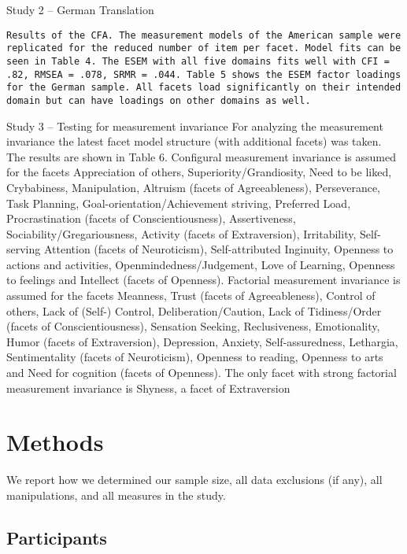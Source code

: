 \documentclass[man]{apa6}
\theoremstyle{definition}
\theoremstyle{definition}
\theoremstyle{definition}
\theoremstyle{remark}
\begin{document}
Study 2 -- German Translation

\begin{verbatim}
Results of the CFA. The measurement models of the American sample were replicated for the reduced number of item per facet. Model fits can be seen in Table 4. The ESEM with all five domains fits well with CFI = .82, RMSEA = .078, SRMR = .044. Table 5 shows the ESEM factor loadings for the German sample. All facets load significantly on their intended domain but can have loadings on other domains as well.
\end{verbatim}

Study 3 -- Testing for measurement invariance For analyzing the
measurement invariance the latest facet model structure (with additional
facets) was taken. The results are shown in Table 6. Configural
measurement invariance is assumed for the facets Appreciation of others,
Superiority/Grandiosity, Need to be liked, Crybabiness, Manipulation,
Altruism (facets of Agreeableness), Perseverance, Task Planning,
Goal-orientation/Achievement striving, Preferred Load, Procrastination
(facets of Conscientiousness), Assertiveness,
Sociability/Gregariousness, Activity (facets of Extraversion),
Irritability, Self-serving Attention (facets of Neuroticism),
Self-attributed Inginuity, Openness to actions and activities,
Openmindedness/Judgement, Love of Learning, Openness to feelings and
Intellect (facets of Openness). Factorial measurement invariance is
assumed for the facets Meanness, Trust (facets of Agreeableness),
Control of others, Lack of (Self-) Control, Deliberation/Caution, Lack
of Tidiness/Order (facets of Conscientiousness), Sensation Seeking,
Reclusiveness, Emotionality, Humor (facets of Extraversion), Depression,
Anxiety, Self-assuredness, Lethargia, Sentimentality (facets of
Neuroticism), Openness to reading, Openness to arts and Need for
cognition (facets of Openness). The only facet with strong factorial
measurement invariance is Shyness, a facet of Extraversion

\hypertarget{methods-1}{%
\section{Methods}\label{methods-1}}

We report how we determined our sample size, all data exclusions (if
any), all manipulations, and all measures in the study.

\hypertarget{participants}{%
\subsection{Participants}\label{participants}}
\end{document}
